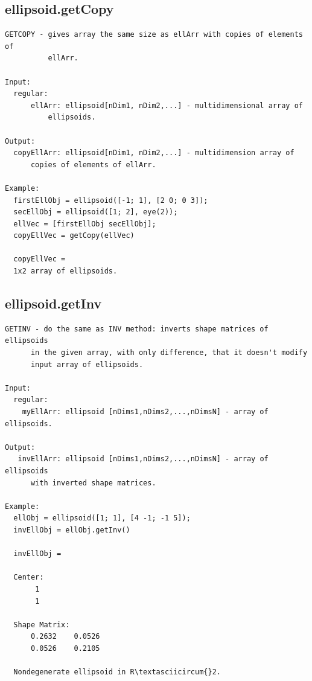 \documentclass[letterpaper,10pt,english]{sphinxmanual}
\begin{document}
\subsection{ellipsoid.getCopy}
\label{chap_functions:ellipsoid-getcopy}
\begin{Verbatim}[commandchars=\\\{\}]
GETCOPY - gives array the same size as ellArr with copies of elements of
          ellArr.

Input:
  regular:
      ellArr: ellipsoid[nDim1, nDim2,...] - multidimensional array of
          ellipsoids.

Output:
  copyEllArr: ellipsoid[nDim1, nDim2,...] - multidimension array of
      copies of elements of ellArr.

Example:
  firstEllObj = ellipsoid([-1; 1], [2 0; 0 3]);
  secEllObj = ellipsoid([1; 2], eye(2));
  ellVec = [firstEllObj secEllObj];
  copyEllVec = getCopy(ellVec)

  copyEllVec =
  1x2 array of ellipsoids.
\end{Verbatim}


\subsection{ellipsoid.getInv}
\label{chap_functions:ellipsoid-getinv}
\begin{Verbatim}[commandchars=\\\{\}]
GETINV - do the same as INV method: inverts shape matrices of ellipsoids
      in the given array, with only difference, that it doesn't modify
      input array of ellipsoids.

Input:
  regular:
    myEllArr: ellipsoid [nDims1,nDims2,...,nDimsN] - array of ellipsoids.

Output:
   invEllArr: ellipsoid [nDims1,nDims2,...,nDimsN] - array of ellipsoids
      with inverted shape matrices.

Example:
  ellObj = ellipsoid([1; 1], [4 -1; -1 5]);
  invEllObj = ellObj.getInv()

  invEllObj =

  Center:
       1
       1

  Shape Matrix:
      0.2632    0.0526
      0.0526    0.2105

  Nondegenerate ellipsoid in R\textasciicircum{}2.
\end{Verbatim}
\end{document}
